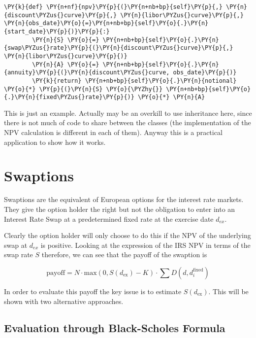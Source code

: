 \begin{codebox}[breakable, size=fbox, boxrule=1pt, pad at break*=1mm,colback=cellbackground, colframe=cellborder]
\begin{Verbatim}[commandchars=\\\{\}]
    \PY{k}{def} \PY{n+nf}{npv}\PY{p}{(}\PY{n+nb+bp}{self}\PY{p}{,} \PY{n}{discount\PYZus{}curve}\PY{p}{,} \PY{n}{libor\PYZus{}curve}\PY{p}{,} \PY{n}{obs_date}\PY{o}{=}\PY{n+nb+bp}{self}\PY{o}{.}\PY{n}{start_date}\PY{p}{)}\PY{p}{:}
        \PY{n}{S} \PY{o}{=} \PY{n+nb+bp}{self}\PY{o}{.}\PY{n}{swap\PYZus{}rate}\PY{p}{(}\PY{n}{discount\PYZus{}curve}\PY{p}{,} \PY{n}{libor\PYZus{}curve}\PY{p}{)}
        \PY{n}{A} \PY{o}{=} \PY{n+nb+bp}{self}\PY{o}{.}\PY{n}{annuity}\PY{p}{(}\PY{n}{discount\PYZus{}curve, obs_date}\PY{p}{)}
        \PY{k}{return} \PY{n+nb+bp}{self}\PY{o}{.}\PY{n}{notional} \PY{o}{*} \PY{p}{(}\PY{n}{S} \PY{o}{\PYZhy{}} \PY{n+nb+bp}{self}\PY{o}{.}\PY{n}{fixed\PYZus{}rate}\PY{p}{)} \PY{o}{*} \PY{n}{A}
\end{Verbatim}
\end{codebox}

This is just an example. Actually may be an overkill to use inheritance here, since there is not much of code to share between the classes (the implementation of the NPV calculation is different in each of them).
Anyway this is a practical application to show how it works.

\section{Swaptions}\label{interest-rate-swaptions}

Swaptions are the equivalent of European options for the interest rate
markets. They give the option holder the right but not the obligation
to enter into an Interest Rate Swap at a predetermined fixed rate
at the exercise date \(d_{ex}\).

Clearly the option holder will only choose to do this if the NPV of the
underlying swap at \(d_{ex}\) is positive. Looking at the expression
of the IRS NPV in terms of the swap rate \(S\) therefore, we can
see that the payoff of the swaption is

\begin{equation}
\mathrm{payoff} = N\cdot \mathrm{max}(0, S(d_{\mathrm{ex}}) - K)\cdot\sum D(d, d_i^{\mathrm{fixed}})
\label{eq:swaption_payoff}
\end{equation}

In order to evaluate this payoff the key issue is to estimate $S(d_{\mathrm{ex}})$. This will be shown with two alternative approaches.

\subsection{Evaluation through Black-Scholes Formula}
\label{evaluation-through-black-scholes-formula}

